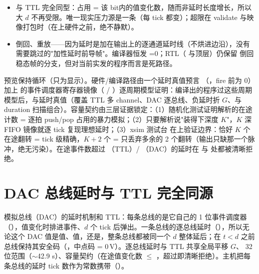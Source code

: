 \documentclass[11pt,oneside,openany]{book}
\begin{document}
\begin{itemize}
  \item {} 与 TTL 完全同型：占用 = 该 bit内的值变化数，随而非延时长度增长，所以大 $d$ 不再受限。唯一现实压力源是一条（每 tick 都变）；超限在 validate 与映像打包时（在上硬件之前，绝不静默）。
  \item {} 倒回、重放——因为延时是加在输出上的逐通道延时线（不烘进边沿），没有需要跳过的"加性延时前导帧"。编译器恒发 =0；RTL（ 与顶层）仍保留  倒回稳态帧的分支，但对当前实发的程序而言是死路径。
\end{itemize}

\begin{notebox}[如何证明]
预览保持循环（只为显示）。硬件/编译路径由一个延时真值预言 （，fire 前为 0）加上  的事件调度器寄存器镜像（ / ）逐周期模型证明：编译出的程序过这些周期模型后，与延时真值（覆盖 TTL 多 channel、DAC 逐总线、负延时折 $G$、与 duration 扫描组合）。容量契约由三层证据锁定：（1）随机化测试证明解析的在途计数 = 逐拍 push/pop 占用的暴力模拟；（2）只要解析说"装得下深度 $K$"，$K$ 深 FIFO 镜像就逐 tick 复现理想延时；（3）xsim 测试台  在上验证边界：恰好 $K$ 个在途翻转 = tick 级精确，$K{+}2$ 个 = 只丢弃多余的 2 个翻转（输出只缺那一个脉冲，绝无污染）。在途事件数超过 （TTL）/ （DAC）的延时在  与  处都被清晰拒绝。
\end{notebox}

\section{DAC 总线延时与 TTL 完全同源}
模拟总线（DAC）的延时机制和 TTL：每条总线的是它自己的 1 位事件调度器（），值变化时排进事件、$d$ 个 tick 后弹出。一条总线的逐总线延时（），所以无论这个 DAC 值是值、值，还是，整条总线都被同一个 $d$ 整体延后；在 $t < d$ 之前总线保持其安全码（，中点码 = 0\,V）。逐总线延时与 TTL 共享全局平移 $G$、 32 位范围（$\sim$42.9 s）、容量契约（在途值变化数 $\le$ ，超过即清晰拒绝）。主机把每条总线的延时 tick 数作为常数携带（）。
\end{document}
